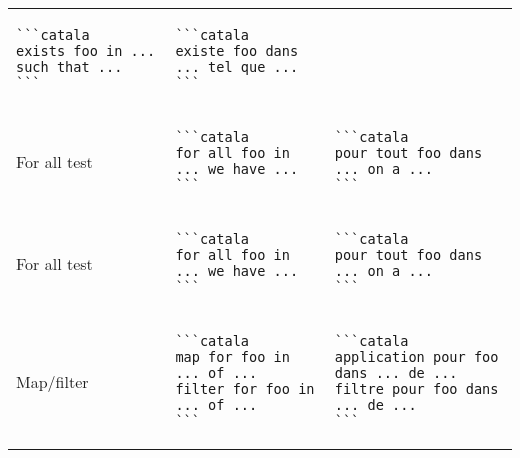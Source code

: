 \documentclass[a3paper,landscape]{article}
\begin{document}
\begin{multicols*}{2}
\begin{center}
\begin{tabular}{p{}p{}p{}}
\begin{verbatim}
```catala
exists foo in ... such that ...
```
\end{verbatim}
      \vspace*{-1.75em}
                         &
      \vspace*{-1.75em}
      \begin{verbatim}
```catala
existe foo dans ... tel que ...
```
\end{verbatim}
      \vspace*{-1.75em}
      \\
      For all test       &
      \vspace*{-1.75em}
      \begin{verbatim}
```catala
for all foo in ... we have ...
```
\end{verbatim}
      \vspace*{-1.75em}
                         &
      \vspace*{-1.75em}
      \begin{verbatim}
```catala
pour tout foo dans ... on a ...
```
\end{verbatim}
      \vspace*{-1.75em}
      \\
      For all test       &
      \vspace*{-1.75em}
      \begin{verbatim}
```catala
for all foo in ... we have ...
```
\end{verbatim}
      \vspace*{-1.75em}
                         &
      \vspace*{-1.75em}
      \begin{verbatim}
```catala
pour tout foo dans ... on a ...
```
\end{verbatim}
      \vspace*{-1.75em}
      \\
      Map/filter         &
      \vspace*{-1.75em}
      \begin{verbatim}
```catala
map for foo in ... of ...
filter for foo in ... of ...
```
\end{verbatim}
      \vspace*{-1.75em}
                         &
      \vspace*{-1.75em}
      \begin{verbatim}
```catala
application pour foo dans ... de ...
filtre pour foo dans ... de ...
```
\end{verbatim}
      \vspace*{-1.75em}

\end{tabular}
\end{center}
\end{multicols*}
\end{document}
